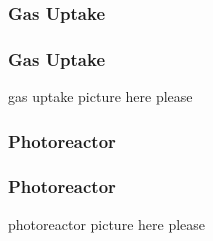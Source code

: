 \documentclass{presentation}
\begin{document}
\begin{frame}\frametitle{Gas Uptake}
\end{frame}

\begin{frame}\frametitle{Gas Uptake}
  gas uptake picture here please
\end{frame}

\begin{frame}\frametitle{Photoreactor}
\end{frame}

\begin{frame}\frametitle{Photoreactor}
  photoreactor picture here please
\end{frame}
\end{document}
